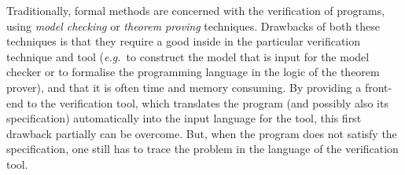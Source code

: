 \documentclass[a4paper]{llncs}
\begin{document}

Traditionally, formal methods are concerned with the verification of
programs, using \textit{model checking} or 
\textit{theorem proving} techniques. Drawbacks of both these
techniques is that they require a good inside in the particular
verification technique and tool (\emph{e.g.}~to construct the model
that is input for the model checker or to formalise the programming
language in the logic of the theorem prover), and that it is often time
and memory consuming. By providing a front-end to the verification
tool, which translates the program (and possibly also its
specification) automatically into the input language for the tool,
this first drawback partially can be overcome. But, when the program
does not satisfy the specification, one still has to trace the problem 
in the language of the verification tool.


\end{document}
